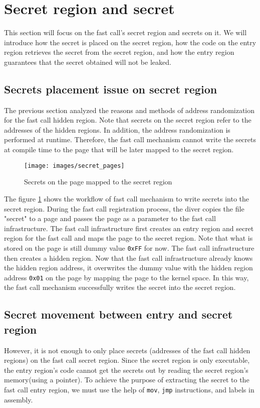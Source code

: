 \section{Secret region and secret}

This section will focus on the fast call's secret region and 
secrets on it. We will introduce how the secret is placed on the secret region, how the code on 
the entry region retrieves the secret from the secret region, 
and how the entry region guarantees that the secret obtained will not be leaked.

\subsection{Secrets placement issue on secret region}
The previous section analyzed the reasons and methods of address randomization 
for the fast call hidden region. Note that secrets on the secret region refer 
to the addresses of the hidden regions. In addition, the address randomization 
is performed at runtime. Therefore, the fast call mechanism cannot write the 
secrets at compile time to the page that will be later mapped to the secret region.

\begin{figure}[tbp]
  \centering
  \texttt{[image: images/secret\_pages]}
  \caption[Short description]{Secrets on the page mapped to the secret region}
  \label{fig:secret_pages}
\end{figure}

The figure \ref{fig:secret_pages} shows the workflow of fast call mechanism to write secrets into the secret region. 
During the fast call registration process,
the diver copies the file "secret" to a page and passes the page as a parameter to
 the fast call infrastructure. The fast call infrastructure first creates an entry 
 region and secret region for the fast call and maps the page to the secret region. 
 Note that what is stored on the page is still dummy value \verb|0xFF| for now. The fast call 
 infrastructure then creates a hidden region. Now that the fast call infrastructure 
 already knows the hidden region address, it overwrites the dummy value with the hidden 
 region address \verb|0x01| on the page by mapping the page to the kernel space. In this way, the fast call mechanism 
 successfully writes the secret into the secret region.

 \subsection{Secret movement between entry and secret region}
 However, it is not enough to only place secrets
 (addresses of the fast call hidden regions) on the fast call secret region. 
 Since the secret region is only executable, the entry region's code cannot 
 get the secrets out by reading the secret region's memory(using a pointer).
To achieve the purpose of extracting the secret to the fast call entry region, 
  we must use the help of \verb|mov|, \verb|jmp| instructions, and labels in assembly.

